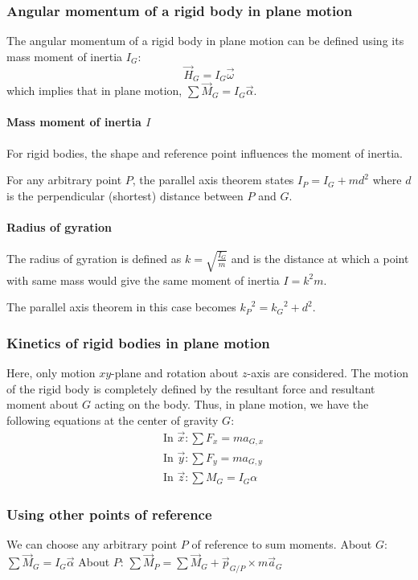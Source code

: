 \documentclass[10pt, twocolumn]{article}
\begin{document}
\subsubsection{Angular momentum of a rigid body in plane motion}
The angular momentum of a rigid body in plane motion can be defined using its mass moment of inertia \(I_G\):
\[
  \vec{H}_G = I_G \vec{\omega}
\]
which implies that in plane motion, \(\sum{\vec{M}_G} = I_G \vec{\alpha}\).


\paragraph{Mass moment of inertia \(I\)}
For rigid bodies, the shape and reference point influences the moment of inertia.

For any arbitrary point \(P\), the parallel axis theorem states \(I_P = I_G + md^2\) where \(d\) is the perpendicular (shortest) distance between \(P\) and \(G\).


\paragraph{Radius of gyration}
The radius of gyration is defined as \(k = \sqrt{\frac{I_G}{m}}\) and is the distance at which a point with same mass would give the same moment of inertia \(I = k^2 m\).

The parallel axis theorem in this case becomes \({k_P}^2 = {k_G}^2 + d^2\).


\subsubsection{Kinetics of rigid bodies in plane motion}
Here, only motion \(xy\)-plane and rotation about \(z\)-axis are considered.
The motion of the rigid body is completely defined by the resultant force and resultant moment about \(G\) acting on the body.
Thus, in plane motion, we have the following equations at the center of gravity \(G\):
\begin{align*}
   & \text{In } \vec{x}:\sum{F_x} = m a_{G,x}  \\
   & \text{In } \vec{y}:\sum{F_y} = m a_{G,y}  \\
   & \text{In } \vec{z}:\sum{M_G} = I_G \alpha
\end{align*}


\subsubsection{Using other points of reference}
We can choose any arbitrary point \(P\) of reference to sum moments.
About \(G\): \(\sum{\vec{M}_G} = I_G \vec{\alpha}\)
About \(P\): \(\sum{\vec{M}_P} = \sum{\vec{M}_G} + \vec{p}_{G/P} \times m\vec{a}_G\)
\end{document}
